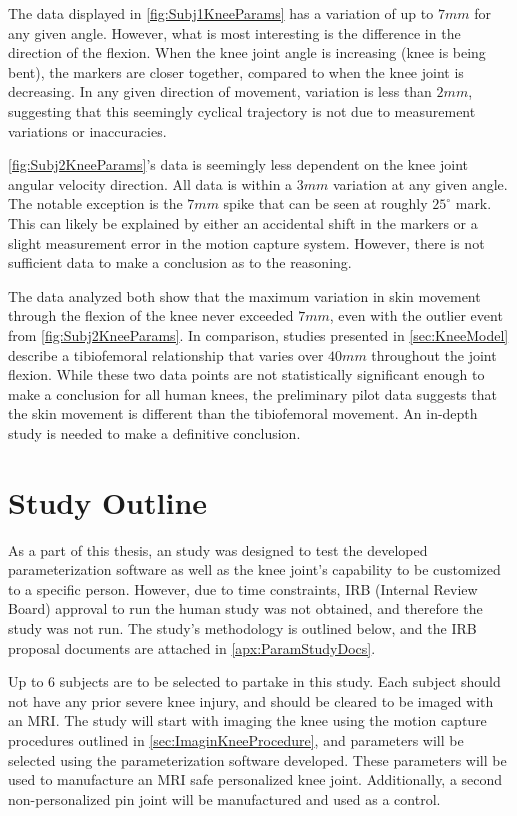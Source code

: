The data displayed in \autoref{fig:Subj1KneeParams} has a variation of up to \(7mm\) for any given angle. However, what is most interesting is the difference in the direction of the flexion. When the knee joint angle is increasing (knee is being bent), the markers are closer together, compared to when the knee joint is decreasing. In any given direction of movement, variation is less than \(2mm\), suggesting that this seemingly cyclical trajectory is not due to measurement variations or inaccuracies.

\autoref{fig:Subj2KneeParams}'s data is seemingly less dependent on the knee joint angular velocity direction. All data is within a \(3mm\) variation at any given angle. The notable exception is the \(7mm\) spike that can be seen at roughly \(25^\circ\) mark. This can likely be explained by either an accidental shift in the markers or a slight measurement error in the motion capture system. However, there is not sufficient data to make a conclusion as to the reasoning.

The data analyzed both show that the maximum variation in skin movement through the flexion of the knee never exceeded \(7mm\), even with the outlier event from \autoref{fig:Subj2KneeParams}. In comparison, studies presented in \autoref{sec:KneeModel} describe a tibio\-femoral relationship that varies over \(40mm\) throughout the joint flexion. While these two data points are not statistically significant enough to make a conclusion for all human knees, the preliminary pilot data suggests that the skin movement is different than the tibiofemoral movement. An in-depth study is needed to make a definitive conclusion.

\section{Study Outline}

As a part of this thesis, an study was designed to test the developed parameterization software as well as the knee joint's capability to be customized to a specific person. However, due to time constraints, IRB (Internal Review Board) approval to run the human study was not obtained, and therefore the study was not run. The study's methodology is outlined below, and the IRB proposal documents are attached in \autoref{apx:ParamStudyDocs}.

Up to 6 subjects are to be selected to partake in this study. Each subject should not have any prior severe knee injury, and should be cleared to be imaged with an MRI. The study will start with imaging the knee using the motion capture procedures outlined in \autoref{sec:ImaginKneeProcedure}, and parameters will be selected using the parameterization software developed. These parameters will be used to manufacture an MRI safe personalized knee joint. Additionally, a second non-personalized pin joint will be manufactured and used as a control.

